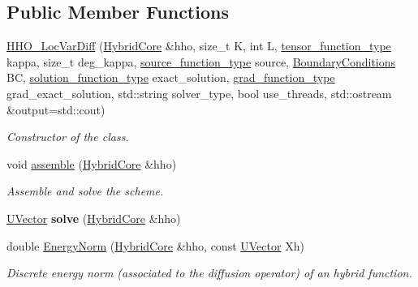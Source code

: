 \subsection*{Public Member Functions}
\begin{DoxyCompactItemize}
\item 
\hyperlink{group__HHO__LocVarDiff_ga6a6f808bf86dd5d3a757422b89df407b}{H\+H\+O\+\_\+\+Loc\+Var\+Diff} (\hyperlink{classHArDCore3D_1_1HybridCore}{Hybrid\+Core} \&hho, size\+\_\+t K, int L, \hyperlink{classHArDCore3D_1_1HHO__LocVarDiff_a70a4ae64b7a421bf535c669f340b2641}{tensor\+\_\+function\+\_\+type} kappa, size\+\_\+t deg\+\_\+kappa, \hyperlink{classHArDCore3D_1_1HHO__LocVarDiff_ab56032fb1c52e4a24e75af0002d0a2d4}{source\+\_\+function\+\_\+type} source, \hyperlink{classBoundaryConditions}{Boundary\+Conditions} BC, \hyperlink{classHArDCore3D_1_1HHO__LocVarDiff_a7b0e23cbc8db30ca257c47df7fd4ca25}{solution\+\_\+function\+\_\+type} exact\+\_\+solution, \hyperlink{classHArDCore3D_1_1HHO__LocVarDiff_aac4d74b1420ac542bcc2b96c11ccba55}{grad\+\_\+function\+\_\+type} grad\+\_\+exact\+\_\+solution, std\+::string solver\+\_\+type, bool use\+\_\+threads, std\+::ostream \&output=std\+::cout)
\begin{DoxyCompactList}\small\item\em Constructor of the class. \end{DoxyCompactList}\item 
void \hyperlink{group__HHO__LocVarDiff_ga5fa4c3b9a58d7208198ee0d6860c093a}{assemble} (\hyperlink{classHArDCore3D_1_1HybridCore}{Hybrid\+Core} \&hho)
\begin{DoxyCompactList}\small\item\em Assemble and solve the scheme. \end{DoxyCompactList}\item 
\hyperlink{classHArDCore3D_1_1UVector}{U\+Vector} {\bfseries solve} (\hyperlink{classHArDCore3D_1_1HybridCore}{Hybrid\+Core} \&hho)
\item 
double \hyperlink{group__HHO__LocVarDiff_ga19858d12d0b2dd817aac99a36f390e2e}{Energy\+Norm} (\hyperlink{classHArDCore3D_1_1HybridCore}{Hybrid\+Core} \&hho, const \hyperlink{classHArDCore3D_1_1UVector}{U\+Vector} Xh)
\begin{DoxyCompactList}\small\item\em Discrete energy norm (associated to the diffusion operator) of an hybrid function. \end{DoxyCompactList}\item 
\mbox{\label{classHArDCore3D_1_1HHO__LocVarDiff_a4232eab7b9753215b506d5ce701c4f4f}} 

\end{DoxyCompactItemize}
